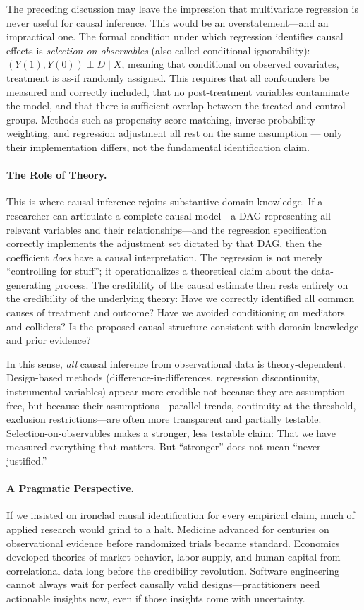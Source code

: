 The preceding discussion may leave the impression that multivariate regression is never useful for causal inference.
This would be an overstatement---and an impractical one.
The formal condition under which regression identifies causal effects is \emph{selection on observables} (also called conditional ignorability): $(Y(1), Y(0)) \perp D \mid X$, meaning that conditional on observed covariates, treatment is as-if randomly assigned.
This requires that all confounders be measured and correctly included, that no post-treatment variables contaminate the model, and that there is sufficient overlap between the treated and control groups.
Methods such as propensity score matching, inverse probability weighting, and regression adjustment all rest on the same assumption — only their implementation differs, not the fundamental identification claim.

\paragraph{The Role of Theory.}
This is where causal inference rejoins substantive domain knowledge.
If a researcher can articulate a complete causal model---a DAG representing all relevant variables and their relationships---and the regression specification correctly implements the adjustment set dictated by that DAG, then the coefficient \emph{does} have a causal interpretation.
The regression is not merely ``controlling for stuff''; it operationalizes a theoretical claim about the data-generating process.
The credibility of the causal estimate then rests entirely on the credibility of the underlying theory: Have we correctly identified all common causes of treatment and outcome?
Have we avoided conditioning on mediators and colliders?
Is the proposed causal structure consistent with domain knowledge and prior evidence?

In this sense, \emph{all} causal inference from observational data is theory-dependent.
Design-based methods (difference-in-differences, regression discontinuity, instrumental variables) appear more credible not because they are assumption-free, but because their assumptions---parallel trends, continuity at the threshold, exclusion restrictions---are often more transparent and partially testable.
Selection-on-observables makes a stronger, less testable claim: That we have measured everything that matters.
But ``stronger'' does not mean ``never justified.''

\paragraph{A Pragmatic Perspective.}
If we insisted on ironclad causal identification for every empirical claim, much of applied research would grind to a halt.
Medicine advanced for centuries on observational evidence before randomized trials became standard.
Economics developed theories of market behavior, labor supply, and human capital from correlational data long before the credibility revolution.
Software engineering cannot always wait for perfect causally valid designs---practitioners need actionable insights now, even if those insights come with uncertainty.

